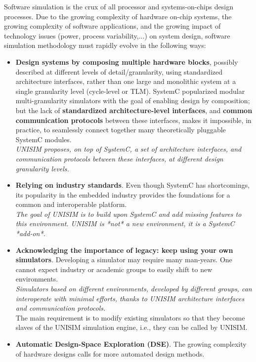  Software simulation is the crux of all processor and systems-on-chips design processes. Due to the growing complexity of hardware on-chip systems, the growing complexity of software applications, and the growing impact of technology issues (power, process variability,...) on system design, software simulation methodology must rapidly evolve in the following ways:

\begin{itemize}
\item \textbf{Design systems by composing multiple hardware blocks}, possibly described at different levels of detail/granularity, using standardized architecture interfaces, rather than one large and monolithic system at a single granularity level (cycle-level or TLM). SystemC popularized modular multi-granularity simulators with the goal of enabling design by composition; but the lack of \textbf{standardized architecture-level interfaces}, and \textbf{common communication protocols} between these interfaces, makes it impossible, in practice, to seamlessly connect together many theoretically pluggable SystemC modules.\\
\emph{UNISIM proposes, on top of SystemC, a set of architecture interfaces, and communication protocols between these interfaces, at different design granularity levels.}
\item \textbf{Relying on industry standards}. Even though SystemC has shortcomings, its popularity in the embedded industry provides the foundations for a common and interoperable platform.\\
\emph{The goal of UNISIM is to build upon SystemC and add missing features to this environment. UNISIM is *not* a new environment, it is a SystemC *add-on*.}
\item \textbf{Acknowledging the importance of legacy: keep using your own simulators}. Developing a simulator may require many man-years. One cannot expect industry or academic groups to easily shift to new environments.\\
\emph{Simulators based on different environments, developed by different groups, can interoperate with minimal efforts, thanks to UNISIM architecture interfaces and communication protocols.}\\
The main requirement is to modify existing simulators so that they become slaves of the UNISIM simulation engine, i.e., they can be called by UNISIM.
\item \textbf{Automatic Design-Space Exploration (DSE)}. The growing complexity of hardware designs calls for more automated design methods.\\

\end{itemize}

